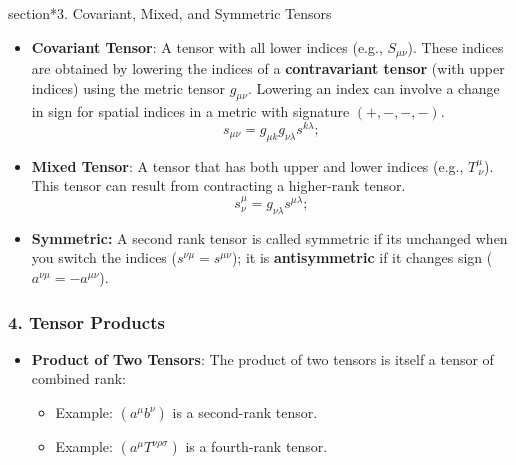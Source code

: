 \documentclass[12pt]{book}
\begin{document}
            \subsubsection{}section*{3. Covariant, Mixed, and Symmetric Tensors}
            
                \begin{itemize}
                    \item \textbf{Covariant Tensor}: A tensor with all lower indices (e.g., \( S_{\mu \nu} \)). These indices are obtained by lowering the indices of a \textbf{contravariant tensor} (with upper indices) using the metric tensor \( g_{\mu \nu} \). Lowering an index can involve a change in sign for spatial indices in a metric with signature \((+, -, -, -)\).
                    \[
                        s_{\mu \nu} = g_{\mu k} g_{\nu \lambda} s^{k \lambda};
                    \]
                    \item \textbf{Mixed Tensor}: A tensor that has both upper and lower indices (e.g., \( T^{\mu}_{\ \nu} \)). This tensor can result from contracting a higher-rank tensor.
                    \[
                        s^{\mu}_{\nu} = g_{\nu \lambda} s^{\mu \lambda};
                    \]
                    \item \textbf{Symmetric:} A second rank tensor is called symmetric if its unchanged when you switch the indices (\(s^{\nu \mu}=s^{\mu \nu}\)); it is \textbf{antisymmetric} if it changes sign (\(a^{\nu \mu}=-a^{\mu \nu}\)).
                \end{itemize}
            
            \subsubsection{4. Tensor Products}
            
                \begin{itemize}
                    \item \textbf{Product of Two Tensors}: The product of two tensors is itself a tensor of combined rank:
                    \begin{itemize}
                        \item Example: \( (a^\mu b^\nu) \) is a second-rank tensor.
                        \item Example: \( (a^\mu T^{\nu \rho \sigma}) \) is a fourth-rank tensor.
                    \end{itemize}
                \end{itemize}
            
\end{document}
